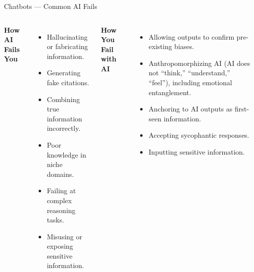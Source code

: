 \documentclass[aspectratio=169]{beamer}
\begin{document}
\begin{frame}[t]{Chatbots — Common AI Fails\\
\small{\parencite{TowardsaStandardforI537, ArtificialIntelligen058}}}
\begin{columns}[T]
    \textbf{How AI Fails You}
    \vspace{0.8em}
    \begin{itemize}
        \item Hallucinating or fabricating information.
        \item Generating fake citations.
        \item Combining true information incorrectly.
        \item Poor knowledge in niche domains.
        \item Failing at complex reasoning tasks.
        \item Misusing or exposing sensitive information.
    \end{itemize}

    \textbf{How You Fail with AI}
    \vspace{0.8em}
    \begin{itemize}
        \item Allowing outputs to confirm pre-existing biases.
        \item Anthropomorphizing AI (AI does not ``think,'' ``understand,'' ``feel''), including emotional entanglement.
        \item Anchoring to AI outputs as first-seen information.
        \item Accepting sycophantic responses.
        \item Inputting sensitive information.
    \end{itemize}
\end{columns}
\end{frame}
\end{document}
